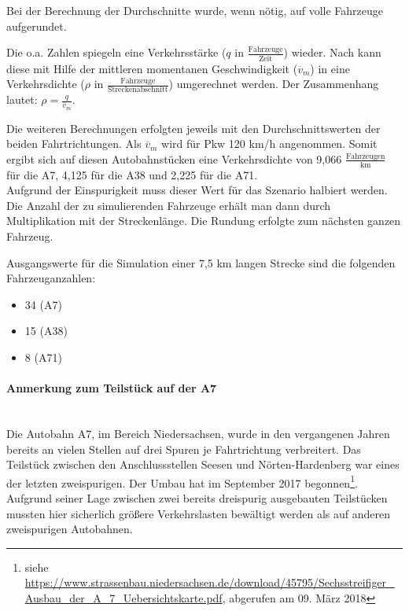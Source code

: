 \noindent
Bei der Berechnung der Durchschnitte wurde, wenn nötig, auf volle Fahrzeuge aufgerundet.

Die o.a. Zahlen spiegeln eine Verkehrsstärke ($q$ in $ \frac{\text{Fahrzeuge}}{\text{Zeit}} $) wieder.
Nach \cite{verkehrsplanung} kann diese mit Hilfe der mittleren momentanen Geschwindigkeit ($\overline{v}_{m}$) in eine Verkehrsdichte ($\rho$ in $ \frac{\text{Fahrzeuge}}{\text{Streckenabschnitt}} $) umgerechnet werden.
Der Zusammenhang lautet: $ \rho = \frac{q}{\overline{v}_{m}} $.

Die weiteren Berechnungen erfolgten jeweils mit den Durchschnittswerten der beiden Fahrtrichtungen.
Als $\overline{v}_{m}$ wird für Pkw 120 km/h angenommen.
Somit ergibt sich auf diesen Autobahnstücken eine Verkehrsdichte von 9,066 $\frac{\text{Fahrzeugen}}{\text{km}}$ für die A7, 4,125 für die A38 und 2,225 für die A71.
\\
Aufgrund der Einspurigkeit muss dieser Wert für das Szenario halbiert werden. 
Die Anzahl der zu simulierenden Fahrzeuge erhält man dann durch Multiplikation mit der Streckenlänge.
Die Rundung erfolgte zum nächsten ganzen Fahrzeug.

Ausgangswerte für die Simulation einer 7,5 km langen Strecke sind die folgenden Fahrzeuganzahlen: 
\begin{itemize}
	\itemsep0em
	\item 34 (A7)
	\item 15 (A38)
	\item 8 (A71)
\end{itemize}

\paragraph*{Anmerkung zum Teilstück auf der A7}
\hfill \\
Die Autobahn A7, im Bereich Niedersachsen, wurde in den vergangenen Jahren bereits an vielen Stellen auf drei Spuren je Fahrtrichtung verbreitert.
Das Teilstück zwischen den Anschlussstellen Seesen und Nörten-Hardenberg war eines der letzten zweispurigen.
Der Umbau hat im September 2017 begonnen\footnote{siehe \url{https://www.strassenbau.niedersachsen.de/download/45795/Sechsstreifiger_Ausbau_der_A_7_Uebersichtskarte.pdf}, abgerufen am 09. März 2018}.
Aufgrund seiner Lage zwischen zwei bereits dreispurig ausgebauten Teilstücken mussten hier sicherlich größere Verkehrslasten bewältigt werden als auf anderen zweispurigen Autobahnen.

